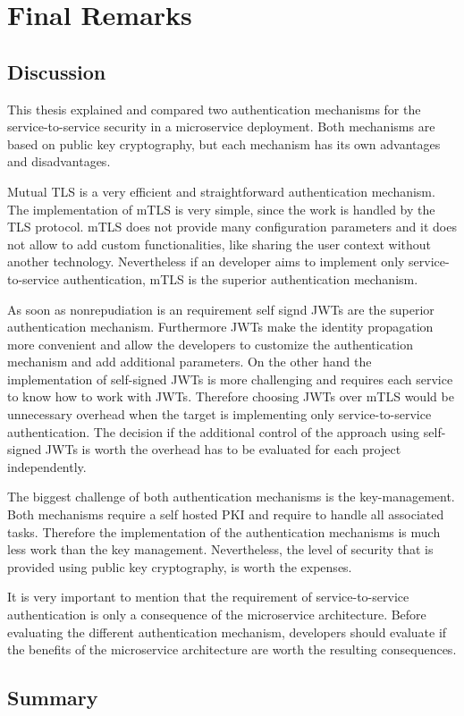 \chapter{Final Remarks}
\label{cha:final_remarks}

\section{Discussion}
This thesis explained and compared two authentication mechanisms for the service-to-service security in a microservice deployment.
Both mechanisms are based on public key cryptography, but each mechanism has its own advantages and disadvantages.

Mutual TLS is a very efficient and straightforward authentication mechanism.
The implementation of mTLS is very simple, since the work is handled by the TLS protocol.
mTLS does not provide many configuration parameters and it does not allow to add custom functionalities, like sharing the user context without another technology.
Nevertheless if an developer aims to implement only service-to-service authentication, mTLS is the superior authentication mechanism.

As soon as nonrepudiation is an requirement self signd JWTs are the superior authentication mechanism.
Furthermore JWTs make the identity propagation more convenient and allow the developers to customize the authentication mechanism and add additional parameters.
On the other hand the implementation of self-signed JWTs is more challenging and requires each service to know how to work with JWTs.
Therefore choosing JWTs over mTLS would be unnecessary overhead when the target is implementing only service-to-service authentication.
The decision if the additional control of the approach using self-signed JWTs is worth the overhead has to be evaluated for each project independently.

The biggest challenge of both authentication mechanisms is the key-management.
Both mechanisms require a self hosted PKI and require to handle all associated tasks.
Therefore the implementation of the authentication mechanisms is much less work than the key management.
Nevertheless, the level of security that is provided using public key cryptography, is worth the expenses.

It is very important to mention that the requirement of service-to-service authentication is only a consequence of the microservice architecture.
Before evaluating the different authentication mechanism, developers should evaluate if the benefits of the microservice architecture are worth the resulting consequences.

\section{Summary}
